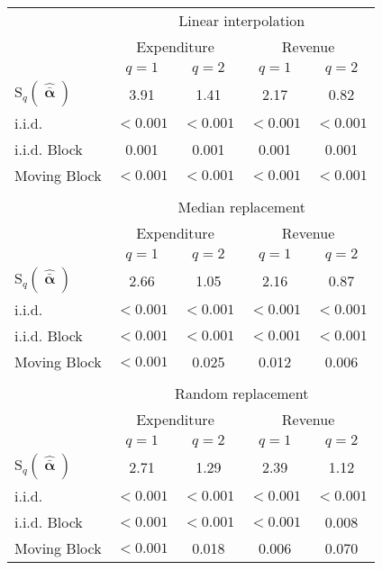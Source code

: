 \begin{tabular}{@{}lcccc@{}}
	\toprule 
	& \multicolumn{4}{c}{ Linear interpolation }\\
	& \multicolumn{2}{c}{ Expenditure } & \multicolumn{2}{c}{ Revenue } \\
	\hline
	& $q=1$ & $q=2$ & $q=1$ & $q=2$ \vspace{2mm}\\
	$\text{S}_q (\boldsymbol{\hat{\bar{\upalpha}}})$ & 3.91 & 1.41 & 2.17 & 0.82\vspace{2mm}\\
	i.i.d. & $<0.001$ & $<0.001$ & $<0.001$ & $<0.001$\\
	i.i.d. Block & 0.001 & 0.001 & 0.001 & 0.001\\
	Moving Block & $<0.001$ & $<0.001$ & $<0.001$ & $<0.001$ \\
	&	&	 &  &  \\
	& \multicolumn{4}{c}{ Median replacement}\\
	& \multicolumn{2}{c}{ Expenditure } & \multicolumn{2}{c}{ Revenue } \\
	\hline
	& $q=1$ & $q=2$ & $q=1$ & $q=2$ \vspace{2mm}\\
	$\text{S}_q (\boldsymbol{\hat{\bar{\upalpha}}})$ & 2.66 & 1.05 & 2.16 & 0.87\vspace{2mm}\\
	i.i.d. & $<0.001$ & $<0.001$ & $<0.001$ & $<0.001$\\
	i.i.d. Block & $<0.001$ & $<0.001$ & $<0.001$ & $<0.001$\\
	Moving Block & $<0.001$ & 0.025 & 0.012 & 0.006 \\
	&	&	 &  &  \\
	& \multicolumn{4}{c}{ Random replacement}\\
	& \multicolumn{2}{c}{ Expenditure } & \multicolumn{2}{c}{ Revenue } \\
	\hline
	& $q=1$ & $q=2$ & $q=1$ & $q=2$ \vspace{2mm}\\
	$\text{S}_q (\boldsymbol{\hat{\bar{\upalpha}}})$ & 2.71 & 1.29 & 2.39 & 1.12\vspace{2mm}\\
	i.i.d. & $<0.001$ & $<0.001$ & $<0.001$ & $<0.001$\\
	i.i.d. Block & $<0.001$ & $<0.001$ & $<0.001$ & 0.008\\
	Moving Block & $<0.001$ & 0.018 & 0.006 & 0.070 \\
	\bottomrule
\end{tabular}